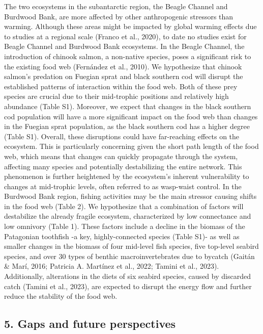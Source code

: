 \documentclass[
]{article}
\begin{document}
The two ecosystems in the subantarctic region, the Beagle Channel and
Burdwood Bank, are more affected by other anthropogenic stressors than
warming. Although these areas might be impacted by global warming
effects due to studies at a regional scale (Franco et al., 2020), to
date no studies exist for Beagle Channel and Burdwood Bank ecosystems.
In the Beagle Channel, the introduction of chinook salmon, a non-native
species, poses a significant risk to the existing food web (Fernández et
al., 2010). We hypothesize that chinook salmon's predation on Fuegian
sprat and black southern cod will disrupt the established patterns of
interaction within the food web. Both of these prey species are crucial
due to their mid-trophic positions and relatively high abundance (Table
S1). Moreover, we expect that changes in the black southern cod
population will have a more significant impact on the food web than
changes in the Fuegian sprat population, as the black southern cod has a
higher degree (Table S1). Overall, these disruptions could have
far-reaching effects on the ecosystem. This is particularly concerning
given the short path length of the food web, which means that changes
can quickly propagate through the system, affecting many species and
potentially destabilizing the entire network. This phenomenon is further
heightened by the ecosystem's inherent vulnerability to changes at
mid-trophic levels, often referred to as wasp-waist control. In the
Burdwood Bank region, fishing activities may be the main stressor
causing shifts in the food web (Table 2). We hypothesize that a
combination of factors will destabilize the already fragile ecosystem,
characterized by low connectance and low omnivory (Table 1). These
factors include a decline in the biomass of the Patagonian toothfish -a
key, highly-connected species (Table S1)- as well as smaller changes in
the biomass of four mid-level fish species, five top-level seabird
species, and over 30 types of benthic macroinvertebrates due to bycatch
(Gaitán \& Marí, 2016; Patricia A. Martínez et al., 2022; Tamini et al.,
2023). Additionally, alterations in the diets of six seabird species,
caused by discarded catch (Tamini et al., 2023), are expected to disrupt
the energy flow and further reduce the stability of the food web.

\hypertarget{gaps-and-future-perspectives}{%
\subsection{5. Gaps and future
perspectives}\label{gaps-and-future-perspectives}}
\end{document}
